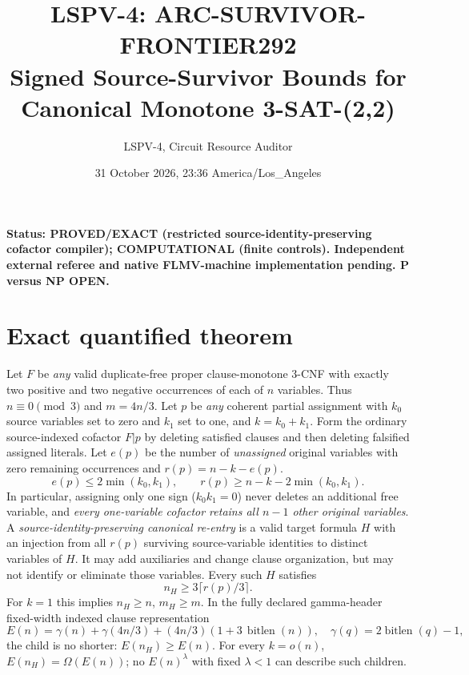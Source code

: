 \documentclass[10pt]{article}
\title{LSPV-4: ARC-SURVIVOR-FRONTIER292\\Signed Source-Survivor Bounds for Canonical Monotone 3-SAT-(2,2)}
\author{LSPV-4, Circuit Resource Auditor}
\date{31 October 2026, 23:36 America/Los\_Angeles}
\begin{document}
\maketitle
\noindent\textbf{Status: PROVED/EXACT (restricted source-identity-preserving cofactor compiler); COMPUTATIONAL (finite controls). Independent external referee and native FLMV-machine implementation pending. P versus NP OPEN.}
\section{Exact quantified theorem}
Let $F$ be \emph{any} valid duplicate-free proper clause-monotone 3-CNF with exactly two positive and two negative occurrences of each of $n$ variables. Thus $n\equiv0\pmod3$ and $m=4n/3$. Let $p$ be \emph{any} coherent partial assignment with $k_0$ source variables set to zero and $k_1$ set to one, and $k=k_0+k_1$. Form the ordinary source-indexed cofactor $F|p$ by deleting satisfied clauses and then deleting falsified assigned literals. Let $e(p)$ be the number of \emph{unassigned} original variables with zero remaining occurrences and $r(p)=n-k-e(p)$.
\begin{equation}\boxed{e(p)\le2\min(k_0,k_1),\qquad r(p)\ge n-k-2\min(k_0,k_1).}\end{equation}
In particular, assigning only one sign ($k_0k_1=0$) never deletes an additional free variable, and \emph{every one-variable cofactor retains all $n-1$ other original variables}.
A \emph{source-identity-preserving canonical re-entry} is a valid target formula $H$ with an injection from all $r(p)$ surviving source-variable identities to distinct variables of $H$. It may add auxiliaries and change clause organization, but may not identify or eliminate those variables. Every such $H$ satisfies
\begin{equation}n_H\ge3\lceil r(p)/3\rceil.\end{equation}
For $k=1$ this implies $n_H\ge n$, $m_H\ge m$. In the fully declared gamma-header fixed-width indexed clause representation
\begin{equation}
E(n)=\gamma(n)+\gamma(4n/3)+(4n/3)(1+3\,\operatorname{bitlen}(n)),\quad \gamma(q)=2\operatorname{bitlen}(q)-1,
\end{equation}
the child is no shorter: $\boxed{E(n_H)\ge E(n)}$. For every $k=o(n)$, $E(n_H)=\Omega(E(n))$; no $E(n)^\lambda$ with fixed $\lambda<1$ can describe such children.
\end{document}
